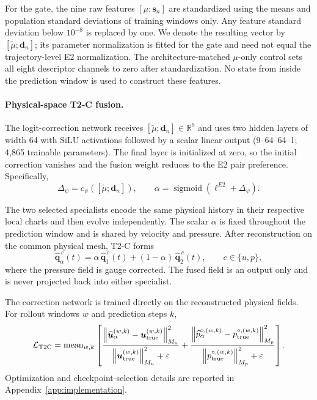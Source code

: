 For the gate, the nine raw features $[\mu;\bm s_n]$ are standardized using the means and population standard deviations of training windows only. Any feature standard deviation below $10^{-8}$ is replaced by one. We denote the resulting vector by $[\widetilde\mu;\bm d_n]$; its parameter normalization is fitted for the gate and need not equal the trajectory-level E2 normalization. The architecture-matched $\mu$-only control sets all eight descriptor channels to zero after standardization. No state from inside the prediction window is used to construct these features.


\paragraph{Physical-space T2-C fusion.}
The logit-correction network receives
$[\widetilde\mu;\bm d_n]\in\mathbb R^9$ and uses two hidden layers of width 64 with SiLU
activations followed by a scalar linear output (9--64--64--1; 4,865 trainable parameters).
The final layer is initialized at zero, so the initial correction vanishes
and the fusion weight reduces to the E2 pair preference.
Specifically,
\begin{equation}
  \Delta_\psi
  =
  c_\psi
  \left(
    [\widetilde\mu;\bm d_n]
  \right),
  \qquad
  \alpha
  =
  \operatorname{sigmoid}
  \left(
    \ell^{E2}+\Delta_\psi
  \right).
  \label{eq:app_t2c_gate}
\end{equation}

The two selected specialists encode the same physical history in their
respective local charts and then evolve independently.
The scalar $\alpha$ is fixed throughout the prediction window and is shared
by velocity and pressure.
After reconstruction on the common physical mesh, T2-C forms
\begin{equation}
  \widehat{\bm q}_{\alpha}^{\,c}(t)
  =
  \alpha\,
  \widehat{\bm q}_{1}^{\,c}(t)
  +
  (1-\alpha)\,
  \widehat{\bm q}_{2}^{\,c}(t),
  \qquad
  c\in\{u,p\},
  \label{eq:app_t2c_field_fusion}
\end{equation}
where the pressure field is gauge corrected.
The fused field is an output only and is never projected back into either
specialist.

The correction network is trained directly on the reconstructed physical
fields. For rollout windows $w$ and prediction steps $k$,
\begin{equation}
  \mathcal L_{\rm T2C}
  =
  \operatorname{mean}_{w,k}
  \left[
    \frac{
      \left\|
        \widehat{\bm u}_{\alpha}^{(w,k)}
        -
        \bm u_{\rm true}^{(w,k)}
      \right\|_{M_u}^2
    }{
      \left\|
        \bm u_{\rm true}^{(w,k)}
      \right\|_{M_u}^2+\varepsilon
    }
    +
    \frac{
      \left\|
        \widehat p_{\alpha}^{\circ,(w,k)}
        -
        p_{\rm true}^{\circ,(w,k)}
      \right\|_{M_p}^2
    }{
      \left\|
        p_{\rm true}^{\circ,(w,k)}
      \right\|_{M_p}^2+\varepsilon
    }
  \right].
  \label{eq:app_t2c_loss}
\end{equation}
Optimization and checkpoint-selection details are reported in
Appendix~\ref{app:implementation}.

